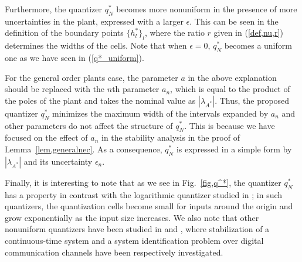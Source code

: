 \documentclass[a4paper, 11pt]{article}
\newcommand{\lambdaAS}{\lambda_{A^*}\!}
\theoremstyle{definition}
\newcommand{\fref}[1]{Fig.~\ref{#1}}
\begin{document}
Furthermore, the quantizer $q^*_N$ becomes more nonuniform in the presence
of more uncertainties in the plant, expressed with a larger $\epsilon$.
This can be seen in the definition of the boundary points $\{h_l^*\}_l$,
where the ratio $r$ given in (\ref{def,nu,r}) determines
the widths of the cells.
Note that when $\epsilon=0$, $q^*_N$ becomes a uniform one as we have
seen in (\ref{q*_uniform}).

For the general order plants case, the parameter $a$ in the above explanation
should be replaced with the $n$th parameter $a_{n}$, which is equal to the product
of the poles of the plant and takes the nominal value as $|\lambdaAS|$.
Thus, the proposed quantizer $q^*_N$ minimizes the maximum width of the
intervals expanded by $a_{n}$ and other parameters do not affect the structure
of $q^*_N$.
This is because we have focused on the effect of $a_{n}$ in the stability
analysis in the proof of Lemma~\ref{lem,generalnec}.
As a consequence, $q^*_N$ is expressed in a simple form by $|\lambdaAS|$
and its uncertainty $\epsilon_n$.

Finally, it is interesting to note that as we see in \fref{fig,q^*}, the quantizer
$q^*_N$ has a property in contrast with the logarithmic quantizer studied
in \cite{Elia2001, Fu2005, Hayakawa2009, Tsumura2009};
in such quantizers, the quantization cells become small for inputs around the origin
and grow exponentially as the input size increases.
We also note that other nonuniform quantizers have been studied in \cite{Li2004}
and \cite{Tsumura2009a}, where stabilization of a continuous-time system
and a system identification problem over digital communication channels
have been respectively investigated.
\end{document}

